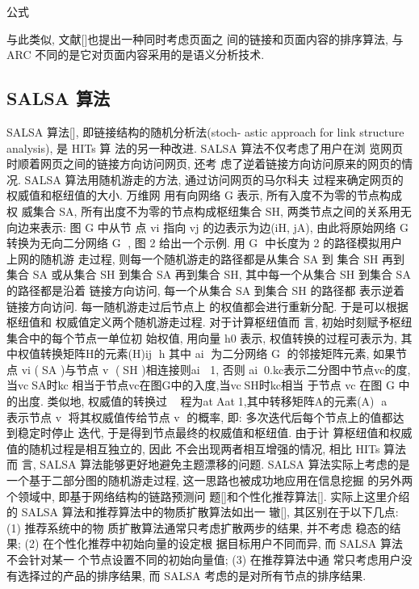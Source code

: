 			公式

			与此类似, 文献[]也提出一种同时考虑页面之 间的链接和页面内容的排序算法, 与 ARC 不同的是它对页面内容采用的是语义分析技术.
\subsection{SALSA 算法}
SALSA 算法[], 即链接结构的随机分析法(stoch- astic approach for link structure analysis), 是 HITs 算 法的另一种改进. SALSA 算法不仅考虑了用户在浏 览网页时顺着网页之间的链接方向访问网页, 还考 虑了逆着链接方向访问原来的网页的情况. SALSA 算法用随机游走的方法, 通过访问网页的马尔科夫 过程来确定网页的权威值和枢纽值的大小. 万维网 用有向网络 G 表示, 所有入度不为零的节点构成权 威集合 SA, 所有出度不为零的节点构成枢纽集合 SH, 两类节点之间的关系用无向边来表示: 图 G 中从节 点 vi 指向 vj 的边表示为边(iH, jA), 由此将原始网络 G转换为无向二分网络 G , 图 2 给出一个示例.
			用 G 中长度为 2 的路径模拟用户上网的随机游 走过程, 则每一个随机游走的路径都是从集合 SA 到 集合 SH 再到集合 SA 或从集合 SH 到集合 SA 再到集合 SH, 其中每一个从集合 SH 到集合 SA 的路径都是沿着 链接方向访问, 每一个从集合 SA 到集合 SH 的路径都 表示逆着链接方向访问. 每一随机游走过后节点上 的权值都会进行重新分配. 于是可以根据枢纽值和 权威值定义两个随机游走过程. 对于计算枢纽值而 言, 初始时刻赋予枢纽集合中的每个节点一单位初 始权值, 用向量 h0 表示, 权值转换的过程可表示为, 其中权值转换矩阵H的元素(H)ij h
			其中 ai 为二分网络 G 的邻接矩阵元素, 如果节点 vi (SA )与节点 v (SH )相连接则ai 1, 否则 ai0.kc表示二分图中节点vc的度,当vcSA时kc 相当于节点vc在图G中的入度,当vcSH时kc相当 于节点 vc 在图 G 中的出度. 类似地, 权威值的转换过 程为atAat1,其中转移矩阵A的元素(A) a  表示节点 v 将其权威值传给节点 v 的概率, 即:
			多次迭代后每个节点上的值都达到稳定时停止 迭代, 于是得到节点最终的权威值和枢纽值. 由于计 算枢纽值和权威值的随机过程是相互独立的, 因此 不会出现两者相互增强的情况, 相比 HITs 算法而 言, SALSA 算法能够更好地避免主题漂移的问题. SALSA 算法实际上考虑的是一个基于二部分图的随机游走过程, 这一思路也被成功地应用在信息挖掘 的另外两个领域中, 即基于网络结构的链路预测问 题[]和个性化推荐算法[]. 实际上这里介绍的 SALSA 算法和推荐算法中的物质扩散算法如出一 辙[], 其区别在于以下几点: (1) 推荐系统中的物 质扩散算法通常只考虑扩散两步的结果, 并不考虑 稳态的结果; (2) 在个性化推荐中初始向量的设定根 据目标用户不同而异, 而 SALSA 算法不会针对某一 个节点设置不同的初始向量值; (3) 在推荐算法中通 常只考虑用户没有选择过的产品的排序结果, 而 SALSA 考虑的是对所有节点的排序结果.

